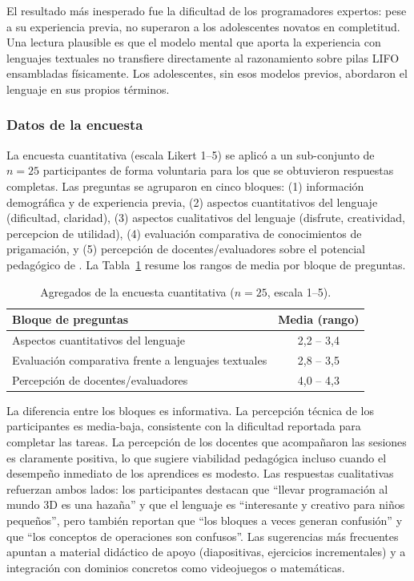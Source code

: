 El resultado m\'as inesperado fue la dificultad de los programadores
expertos: pese a su experiencia previa, no superaron a los
adolescentes novatos en completitud. Una lectura plausible es que el
modelo mental que aporta la experiencia con lenguajes textuales no
transfiere directamente al razonamiento sobre pilas LIFO ensambladas
f\'isicamente. Los adolescentes, sin esos modelos previos, abordaron
el lenguaje en sus propios t\'erminos.

\subsubsection{Datos de la encuesta}
La encuesta cuantitativa (escala Likert 1--5) se aplic\'o a un
sub-conjunto de $n=25$ participantes de forma voluntaria para los que se obtuvieron
respuestas completas. 
Las preguntas se agruparon en cinco bloques: (1) informaci\'on
demogr\'afica y de experiencia previa, (2) aspectos cuantitativos del
lenguaje (\eg dificultad, claridad), (3) aspectos cualitativos del lenguaje
(\eg disfrute, creatividad, percepcion de utilidad), (4) evaluaci\'on comparativa de conocimientos
de prigamaci\'on, y (5) percepci\'on de docentes/evaluadores sobre el potencial pedag\'ogico de \sculpt.
La Tabla~\ref{tab:survey-likert} resume los rangos
de media por bloque de preguntas.

\begin{table}[h]
\centering
\small
\caption{Agregados de la encuesta cuantitativa ($n=25$, escala 1--5).}
\label{tab:survey-likert}
\begin{tabular}{@{}lc@{}}
\toprule
Bloque de preguntas & Media (rango) \\
\midrule
Aspectos cuantitativos del lenguaje              & 2{,}2 -- 3{,}4 \\
Evaluaci\'on comparativa frente a lenguajes textuales & 2{,}8 -- 3{,}5 \\
Percepci\'on de docentes/evaluadores             & 4{,}0 -- 4{,}3 \\
\bottomrule
\end{tabular}
\end{table}

La diferencia entre los bloques es informativa. La percepci\'on
t\'ecnica de los participantes es media-baja, consistente con la
dificultad reportada para completar las tareas. La percepci\'on de
los docentes que acompa\~naron las sesiones es claramente positiva,
lo que sugiere viabilidad pedag\'ogica incluso cuando el desempe\~no
inmediato de los aprendices es modesto. Las respuestas cualitativas
refuerzan ambos lados: los participantes destacan que ``llevar
programaci\'on al mundo 3D es una haza\~na'' y que el lenguaje es
``interesante y creativo para ni\~nos peque\~nos'', pero tambi\'en
reportan que ``los bloques a veces generan confusi\'on'' y que
``los conceptos de operaciones son confusos''. Las sugerencias
m\'as frecuentes apuntan a material did\'actico de apoyo
(diapositivas, ejercicios incrementales) y a integraci\'on con
dominios concretos como videojuegos o matem\'aticas.

